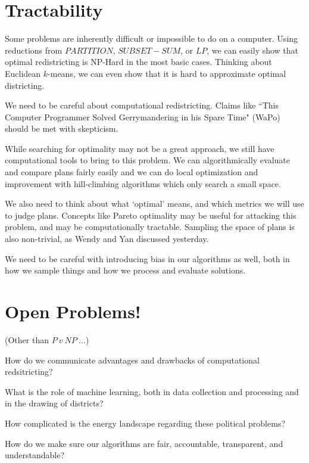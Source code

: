 \section*{Tractability}

Some problems are inherently difficult or impossible to do on a computer.  Using reductions from $PARTITION$, $SUBSET-SUM$, or $LP$, we can easily show that optimal redistricting is NP-Hard in the most basic cases.  Thinking about Euclidean $k$-means, we can even show that it is hard to approximate optimal districting.

We need to be careful about computational redistricting.  Claims like ``This Computer Programmer Solved Gerrymandering in his Spare Time" (WaPo) should be met with skepticism.

While searching for optimality may not be a great approach, we still have computational tools to bring to this problem.  We can algorithmically evaluate and compare plans fairly easily and we can do local optimization and improvement with hill-climbing algorithms which only search a small space.  

We also need to think about what `optimal' means, and which metrics we will use to judge plans.  Concepts like Pareto optimality may be useful for attacking this problem, and may be computationally tractable.  Sampling the space of plans is also non-trivial, as Wendy and Yan discussed yesterday.  

We need to be careful with introducing bias in our algorithms as well, both in how we sample things and how we process and evaluate solutions.



\section*{Open Problems!}

(Other than $P \ v \ NP \ \dots$)

How do we communicate advantages and drawbacks of computational redsitricting?

What is the role of machine learning, both in  data collection and processing and in the drawing of districts?

How complicated is the energy landscape regarding these political problems?

How do we make sure our algorithms are fair, accountable, transparent, and understandable?